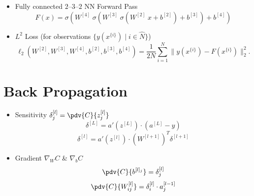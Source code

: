 \begin{frame}
    \begin{itemize}
        \item Fully connected \(2\)--\(3\)--\(2\) \ac{NN} Forward Pass
           \[F(x) = \sigma\!\left( W^{[4]} \;\sigma\!\left(W^{[3]}\; \sigma\!\left(W^{[2]} \; x +b^{[2]}\right) + b^{[3]} \right)
           + b^{[4]}\right)\]
           \pause\item \(L^{2}\) Loss (for observations \(\{y(x^{\{i\}})\mid i \in \hat{N}\}\))
            \[
                \ell_2(W^{[2]}, W^{[3]}, W^{[4]}, b^{[2]}, b^{[3]}, b^{[4]}) = \frac{1}{2N}\sum_{i
                = 1}^{N} \|y(x^{\{i\}}) - F(x^{\{i\}})\|_2^2.
            \] 
    \end{itemize}
\end{frame}


\section{Back Propagation}%
\label{sec:back-propagation}


\begin{frame}
    \begin{itemize}
        \item Sensitivity \(\delta^{[l]}_j = \pdv{C}{z_j^{[l]}}\)
            \[
                \delta^{[L]} = a'(z^{[L]}) \cdot (a^{[L]} - y) 
            \] 
            \[
                \delta^{[l]} = a'(z^{[l]}) \cdot (W^{[l+1]})^T \delta^{[l+1]}
            \] 
        \pause\item Gradient \(\nabla_W C\) \& \(\nabla_b C\)
            \[
                \pdv{C}{b^{[l]_j}}  = \delta^{[l]}_j
            \] 
            \[
                \pdv{C}{W^{[l]}_{ij}} = \delta^{[l]}_i \cdot a^{[l-1]}_j
            \] 
    \end{itemize}
\end{frame}


